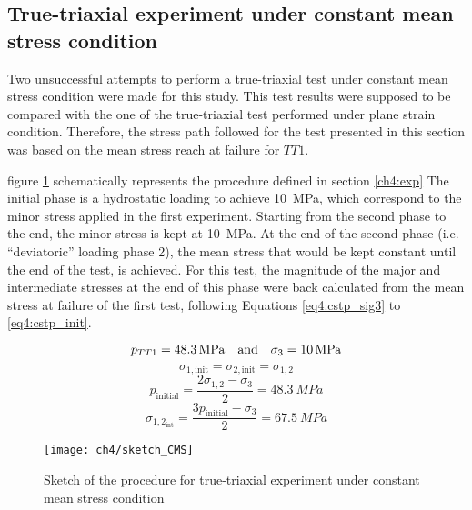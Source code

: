 \subsection{True-triaxial experiment under constant mean stress condition}

Two unsuccessful attempts to perform a true-triaxial test under constant mean stress condition were made for this study. This test results were supposed to be compared with the one of the true-triaxial test performed under plane strain condition. Therefore, the stress path followed for the test presented in this section was based on the mean stress reach at failure for $TT1$.

figure \ref{fig4:16} schematically represents the procedure defined in section \ref{ch4:exp} The initial phase is a hydrostatic loading to achieve \SI{10}{MPa}, which correspond to the minor stress applied in the first experiment. Starting from the second phase to the end, the minor stress is kept at \SI{10}{MPa}. At the end of the second phase (i.e. “deviatoric” loading phase 2), the mean stress that would be kept constant until the end of the test, is achieved. For this test, the magnitude of the major and intermediate stresses at the end of this phase were back calculated from the mean stress at failure of the first test, following Equations \ref{eq4:cstp_sig3} to \ref{eq4:cstp_init}.

\begin{equation}\label{eq4:cstp_sig3}
    p_{TT1} = \SI{48.3}{MPa} \quad \textmd{and} \quad \sigma_3 = \SI{10}{MPa}
\end{equation}
\begin{equation}
    \sigma_{1,\text{init}} = \sigma_{2,\text{init}} = \sigma_{1,2}
\end{equation}
\begin{equation}
    p_\text{initial} = \frac{2\sigma_{1,2}-\sigma_3}{2} = \SI{48.3}{MPa}
\end{equation}
\begin{equation}\label{eq4:cstp_init}
    \sigma_{1,2_{\text{int}}} = \frac{3p_\text{initial}-\sigma_3}{2} = \SI{67.5}{MPa}
\end{equation}
    

\begin{figure}[tb]
    \centering
    \texttt{[image: ch4/sketch\_CMS]}
    \caption{Sketch of the procedure for true-triaxial experiment under constant mean stress condition}
    \label{fig4:16}
\end{figure} 

